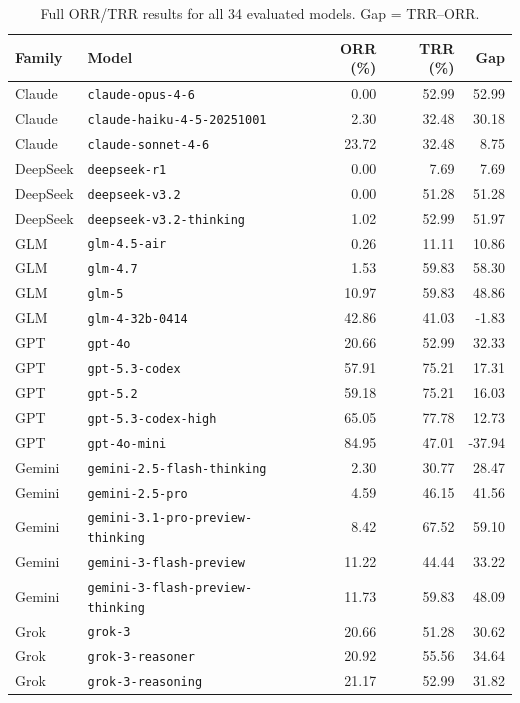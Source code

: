 \documentclass[11pt]{article}
\begin{document}
\begin{table}[h]
\centering
\scriptsize
\caption{Full ORR/TRR results for all 34 evaluated models. Gap = TRR--ORR.}
\label{tab:appendix_full_results}
\begin{tabular}{llrrr}
\toprule
Family & Model & ORR (\%) & TRR (\%) & Gap \\
\midrule
Claude & \texttt{claude-opus-4-6} & 0.00 & 52.99 & 52.99 \\
Claude & \texttt{claude-haiku-4-5-20251001} & 2.30 & 32.48 & 30.18 \\
Claude & \texttt{claude-sonnet-4-6} & 23.72 & 32.48 & 8.75 \\
DeepSeek & \texttt{deepseek-r1} & 0.00 & 7.69 & 7.69 \\
DeepSeek & \texttt{deepseek-v3.2} & 0.00 & 51.28 & 51.28 \\
DeepSeek & \texttt{deepseek-v3.2-thinking} & 1.02 & 52.99 & 51.97 \\
GLM & \texttt{glm-4.5-air} & 0.26 & 11.11 & 10.86 \\
GLM & \texttt{glm-4.7} & 1.53 & 59.83 & 58.30 \\
GLM & \texttt{glm-5} & 10.97 & 59.83 & 48.86 \\
GLM & \texttt{glm-4-32b-0414} & 42.86 & 41.03 & -1.83 \\
GPT & \texttt{gpt-4o} & 20.66 & 52.99 & 32.33 \\
GPT & \texttt{gpt-5.3-codex} & 57.91 & 75.21 & 17.31 \\
GPT & \texttt{gpt-5.2} & 59.18 & 75.21 & 16.03 \\
GPT & \texttt{gpt-5.3-codex-high} & 65.05 & 77.78 & 12.73 \\
GPT & \texttt{gpt-4o-mini} & 84.95 & 47.01 & -37.94 \\
Gemini & \texttt{gemini-2.5-flash-thinking} & 2.30 & 30.77 & 28.47 \\
Gemini & \texttt{gemini-2.5-pro} & 4.59 & 46.15 & 41.56 \\
Gemini & \texttt{gemini-3.1-pro-preview-thinking} & 8.42 & 67.52 & 59.10 \\
Gemini & \texttt{gemini-3-flash-preview} & 11.22 & 44.44 & 33.22 \\
Gemini & \texttt{gemini-3-flash-preview-thinking} & 11.73 & 59.83 & 48.09 \\
Grok & \texttt{grok-3} & 20.66 & 51.28 & 30.62 \\
Grok & \texttt{grok-3-reasoner} & 20.92 & 55.56 & 34.64 \\
Grok & \texttt{grok-3-reasoning} & 21.17 & 52.99 & 31.82 \\

\end{tabular}
\end{table}
\end{document}
